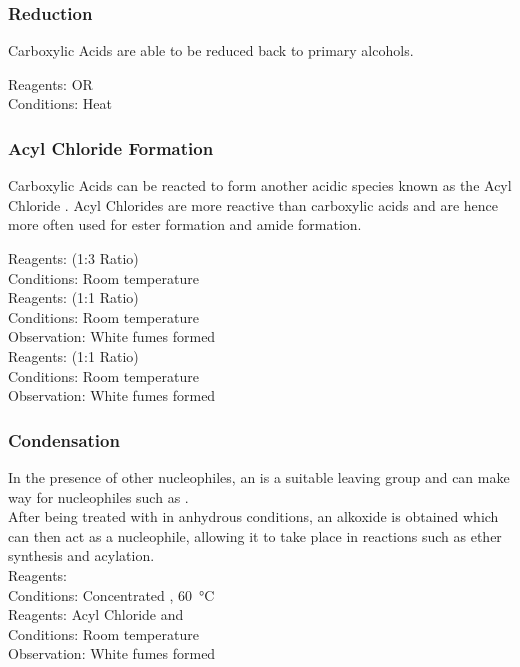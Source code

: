 \documentclass[../main]{subfiles}
\begin{document}
	\subsubsection{Reduction}

	Carboxylic Acids are able to be reduced back to primary alcohols.

	Reagents:  OR  \\
	Conditions: Heat \\

	\subsubsection{Acyl Chloride Formation}

	Carboxylic Acids can be reacted to form another acidic species known as the Acyl Chloride . Acyl Chlorides are more reactive than carboxylic acids and are hence more often used for ester formation and amide formation.

	Reagents:  (1:3 Ratio) \\
	Conditions:  Room temperature \\

	Reagents:  (1:1 Ratio) \\
	Conditions:  Room temperature \\
	Observation: White fumes formed  \\

	Reagents:  (1:1 Ratio) \\
	Conditions:  Room temperature \\
	Observation: White fumes formed  \\

	\subsubsection{Condensation}

	In the presence of other nucleophiles, an  is a suitable leaving group and can make way for nucleophiles such as . \\

	After being treated with  in anhydrous conditions, an alkoxide  is obtained which can then act as a nucleophile, allowing it to take place in reactions such as ether synthesis and acylation. \\

	Reagents:  \\
	Conditions:  Concentrated , \SI{60}{\celsius} \\

	Reagents: Acyl Chloride and  \\
	Conditions:  Room temperature \\
	Observation: White fumes formed  \\
	
\end{document}
